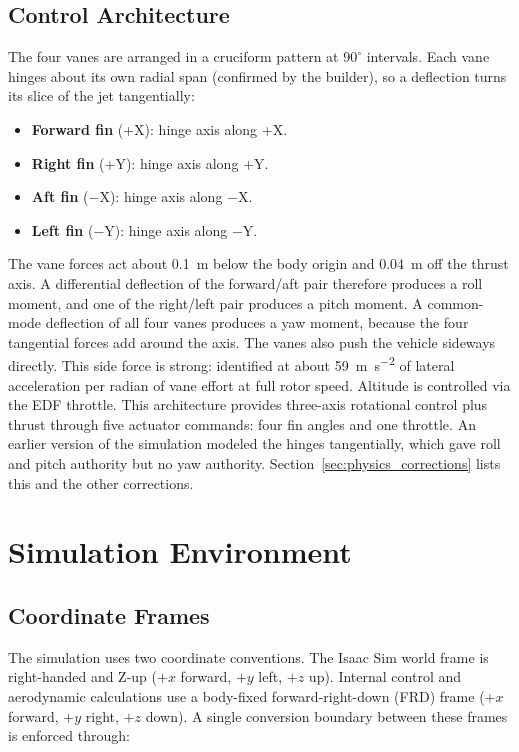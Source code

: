 \documentclass[conference]{IEEEtran}
\begin{document}
\subsection{Control Architecture}

The four vanes are arranged in a cruciform pattern at $90^\circ$ intervals. Each vane hinges about its own radial span (confirmed by the builder), so a deflection turns its slice of the jet tangentially:
\begin{itemize}
    \item \textbf{Forward fin} (+X): hinge axis along +X.
    \item \textbf{Right fin} (+Y): hinge axis along +Y.
    \item \textbf{Aft fin} ($-$X): hinge axis along $-$X.
    \item \textbf{Left fin} ($-$Y): hinge axis along $-$Y.
\end{itemize}

The vane forces act about \SI{0.1}{\metre} below the body origin and \SI{0.04}{\metre} off the thrust axis. A differential deflection of the forward/aft pair therefore produces a roll moment, and one of the right/left pair produces a pitch moment. A common-mode deflection of all four vanes produces a yaw moment, because the four tangential forces add around the axis. The vanes also push the vehicle sideways directly. This side force is strong: identified at about \SI{59}{\metre\per\second\squared} of lateral acceleration per radian of vane effort at full rotor speed. Altitude is controlled via the EDF throttle. This architecture provides three-axis rotational control plus thrust through five actuator commands: four fin angles and one throttle. An earlier version of the simulation modeled the hinges tangentially, which gave roll and pitch authority but no yaw authority. Section~\ref{sec:physics_corrections} lists this and the other corrections.


\section{Simulation Environment}

\subsection{Coordinate Frames}

The simulation uses two coordinate conventions. The Isaac Sim world frame is right-handed and Z-up ($+x$ forward, $+y$ left, $+z$ up). Internal control and aerodynamic calculations use a body-fixed forward-right-down (FRD) frame ($+x$ forward, $+y$ right, $+z$ down). A single conversion boundary between these frames is enforced through:
\end{document}
